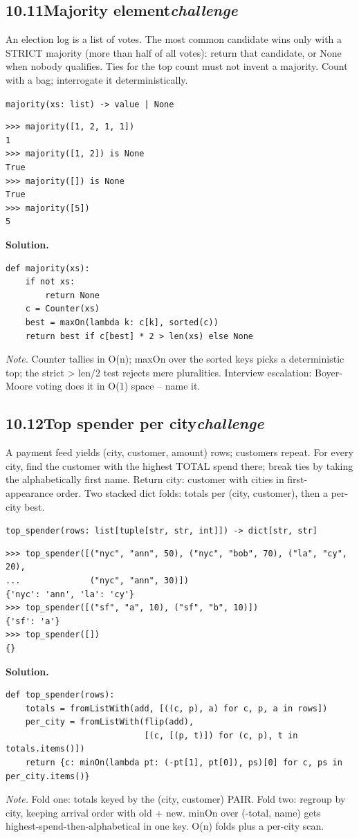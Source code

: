 \documentclass[10pt,letterpaper]{book}
\begin{document}
\subsection*{10.11\quad Majority element\hfill\textnormal{\textit{challenge}}}
An election log is a list of votes. The most common candidate wins only with a STRICT majority (more than half of all votes): return that candidate, or None when nobody qualifies. Ties for the top count must not invent a majority. Count with a bag; interrogate it deterministically.

\noindent\texttt{majority(xs: list) -> value | None}
\begin{lstlisting}[style=ex]
>>> majority([1, 2, 1, 1])
1
>>> majority([1, 2]) is None
True
>>> majority([]) is None
True
>>> majority([5])
5
\end{lstlisting}
\noindent\textbf{Solution.}
\begin{lstlisting}[style=code]
def majority(xs):
    if not xs:
        return None
    c = Counter(xs)
    best = maxOn(lambda k: c[k], sorted(c))
    return best if c[best] * 2 > len(xs) else None
\end{lstlisting}
\noindent\textit{Note.} Counter tallies in O(n); maxOn over the sorted keys picks a deterministic top; the strict > len/2 test rejects mere pluralities. Interview escalation: Boyer-Moore voting does it in O(1) space -- name it.

\subsection*{10.12\quad Top spender per city\hfill\textnormal{\textit{challenge}}}
A payment feed yields (city, customer, amount) rows; customers repeat. For every city, find the customer with the highest TOTAL spend there; break ties by taking the alphabetically first name. Return {city: customer} with cities in first-appearance order. Two stacked dict folds: totals per (city, customer), then a per-city best.

\noindent\texttt{top\_spender(rows: list[tuple[str, str, int]]) -> dict[str, str]}
\begin{lstlisting}[style=ex]
>>> top_spender([("nyc", "ann", 50), ("nyc", "bob", 70), ("la", "cy", 20),
...              ("nyc", "ann", 30)])
{'nyc': 'ann', 'la': 'cy'}
>>> top_spender([("sf", "a", 10), ("sf", "b", 10)])
{'sf': 'a'}
>>> top_spender([])
{}
\end{lstlisting}
\noindent\textbf{Solution.}
\begin{lstlisting}[style=code]
def top_spender(rows):
    totals = fromListWith(add, [((c, p), a) for c, p, a in rows])
    per_city = fromListWith(flip(add),
                            [(c, [(p, t)]) for (c, p), t in totals.items()])
    return {c: minOn(lambda pt: (-pt[1], pt[0]), ps)[0] for c, ps in per_city.items()}
\end{lstlisting}
\noindent\textit{Note.} Fold one: totals keyed by the (city, customer) PAIR. Fold two: regroup by city, keeping arrival order with old + new. minOn over (-total, name) gets highest-spend-then-alphabetical in one key. O(n) folds plus a per-city scan.
\end{document}
